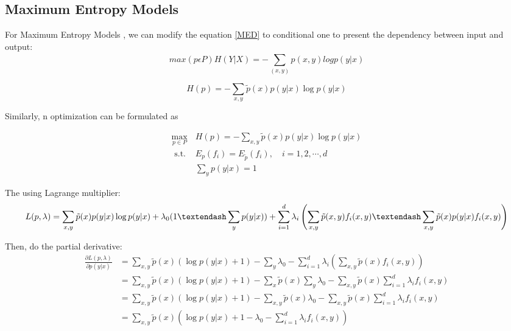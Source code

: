 \documentclass[12pt, a4paper]{article}
\begin{document}
\subsection{Maximum Entropy Models}
For Maximum Entropy Models \cite{10.5555/971143}, we can modify the equation \ref{MED} to conditional one to present the dependency between input and output:
\begin{equation}
max(p\epsilon P)H(Y|X)=-\sum_{(x,y)}^{ }p(x,y)logp(y|x)
\end{equation}

\begin{equation}
H(p) = -\sum_{x,y}\tilde p(x)p(y|x) \log p(y |x ) 
\end{equation}

Similarly, n optimization can be formulated as

\begin{equation}
	\begin{array}{ll}
	\max _{p \in P} & H(p)=-\sum_{x, y} \tilde{p}(x) p(y | x) \log p(y | x) \\
	\text { s.t. } & E_{p}\left(f_{i}\right)=E_{\tilde{p}}\left(f_{i}\right), \quad i=1,2, \cdots, d \\
	& \sum_{y} p(y | x)=1
	\end{array}
\end{equation}


The using Lagrange multiplier: 
\begin{equation}
L(p, \lambda) =\sum_{x,y}\tilde p(x)p(y|x) \log p(y |x )+\lambda_0(1 – \sum_y p(y|x) )+\sum_{i=1}^d \\
 \lambda_i \left(\sum_{x,y} \tilde p(x, y) f_i(x, y) – \sum_{x,y}\tilde p(x)p(y|x)f_i(x, y) \right) 
\end{equation}

Then, do the partial derivative:
\begin{equation}
	\begin{aligned}
	\frac{\partial L(p, \lambda)}{\partial p(y | x)} &=\sum_{x, y} \tilde{p}(x)(\log p(y | x)+1)-\sum_{y} \lambda_{0}-\sum_{i=1}^{d} \lambda_{i}\left(\sum_{x, y} \tilde{p}(x) f_{i}(x, y)\right) \\
	&=\sum_{x, y} \tilde{p}(x)(\log p(y | x)+1)-\sum_{x} \tilde{p}(x) \sum_{y} \lambda_{0}-\sum_{x, y} \tilde{p}(x) \sum_{i=1}^{d} \lambda_{i} f_{i}(x, y) \\
	&=\sum_{x, y} \tilde{p}(x)(\log p(y | x)+1)-\sum_{x, y} \tilde{p}(x) \lambda_{0}-\sum_{x, y} \tilde{p}(x) \sum_{i=1}^{d} \lambda_{i} f_{i}(x, y) \\
	&=\sum_{x, y} \tilde{p}(x)\left(\log p(y | x)+1-\lambda_{0}-\sum_{i=1}^{d} \lambda_{i} f_{i}(x, y)\right)
	\end{aligned}
\end{equation}
\end{document}
